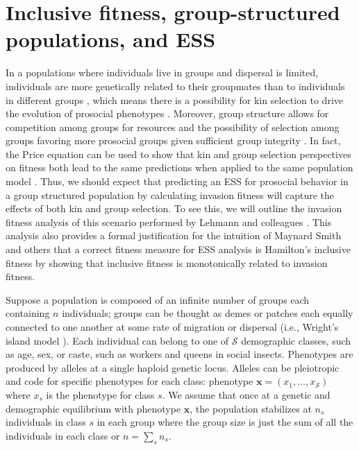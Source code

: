 \documentclass[11pt]{article}
\renewcommand{\vec}[1]{\symbf{#1}}
\newcommand{\numc}{\mathcal{S}}
\begin{document}
\section{Inclusive fitness, group-structured populations, and ESS}

In a populations where individuals live in groups and dispersal is limited, individuals are more genetically related to their groupmates than to individuals in different groups \cite{Wright:1943,Wright:1951,Hamilton:1970}, which means there is a possibility for kin selection to drive the evolution of prosocial phenotypes \cite{Hamilton:1964,Rousset:2004,Lehmann:Rousset:2014}. Moreover, group structure allows for competition among groups for resources and the possibility of selection among groups favoring more prosocial groups given sufficient group integrity \cite{Hamilton:1975,Wilson:Pollock:1992,Traulsen:Nowak:2006,Gardner:West:2006,Lehmann:Rousset:2010}. In fact, the Price equation \cite{Price:1970,Price:1972:cov} can be used to show that kin and group selection perspectives on fitness both lead to the same predictions when applied to the same population model \cite{Queller:1992,Lehmann:Keller:2007,Bijma:Wade:2008,Gardner:West:2007,Marshall:2011,Akcay:VanCleve:2012}. Thus, we should expect that predicting an ESS for prosocial behavior in a group structured population by calculating invasion fitness will capture the effects of both kin and group selection. To see this, we will outline the invasion fitness analysis of this scenario performed by Lehmann and colleagues \cite{Lehmann:Mullon:2016,Lehmann:Rousset:2020}. This analysis also provides a formal justification for the intuition of Maynard Smith \cite{MaynardSmith:1978} and others that a correct fitness measure for ESS analysis is Hamilton's inclusive fitness \cite{Hamilton:1964} by showing that inclusive fitness is monotonically related to invasion fitness.

Suppose a population is composed of an infinite number of groups each containing $n$ individuals; groups can be thought as demes or patches each  equally connected to one another at some rate of migration or dispersal (i.e., Wright's island model \cite{Wright:1931}). Each individual can belong to one of $\numc$ demographic classes, such as age, sex, or caste, such as workers and queens in social insects. Phenotypes are produced by alleles at a single haploid genetic locus. Alleles can be pleiotropic and code for specific phenotypes for each class: phenotype $\vec{x}=(x_{1},\ldots,x_{\numc})$ where $x_{s}$ is the phenotype for class $s$. We assume that once at a genetic and demographic equilibrium with phenotype $\vec{x}$, the population stabilizes at $n_{s}$ individuals in class $s$ in each group where the group size is just the sum of all the individuals in each class or $n = \sum_{s} n_{s}$.
\end{document}
